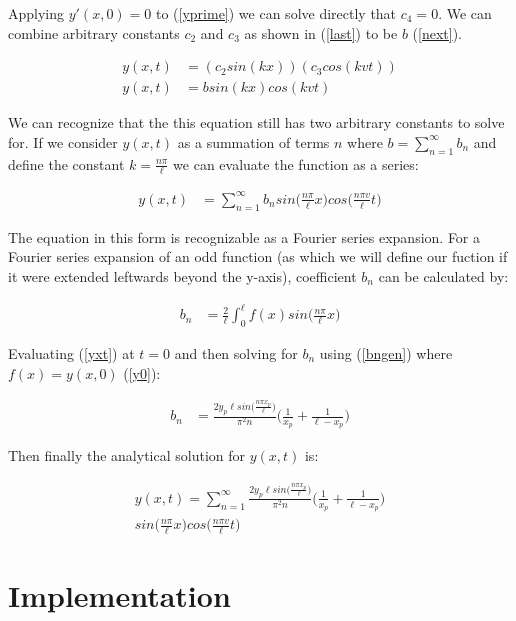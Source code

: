 \documentclass[%
 reprint,
 amsmath,amssymb,
 aps,
]{revtex4-1}
\begin{document}
Applying $y'(x,0)=0$ to (\ref{yprime}) we can solve directly that $c_4 = 0$. We can combine arbitrary constants $c_2$ and $c_3$ as shown in (\ref{last}) to be $b$ (\ref{next}).

\begin{align}
y(x,t) &=(c_2sin(kx))(c_3 cos(kvt)) \label{last}\\
y(x,t) &= b sin(kx)cos(kvt) \label{next}
\end{align}

We can recognize that the this equation still has two arbitrary constants to solve for. If we consider $y(x,t)$ as a summation of terms $n$ where $b = \sum_{n=1}^{\infty} b_n$ and define the constant $k = \frac{n\pi}{\ell}$ we can evaluate the function as a series:

\begin{align}
y(x,t) &= \sum_{n=1}^{\infty} b_n sin\Big(\frac{n\pi}{\ell}x\Big)cos\Big(\frac{n\pi v}{\ell}t\Big) \label{yxt}
\end{align}

The equation in this form is recognizable as a Fourier series expansion. For a Fourier series expansion of an odd function (as which we will define our fuction if it were extended leftwards beyond the y-axis), coefficient $b_n$ can be calculated by:

\begin{align}
b_n &= \frac{2}{\ell} \int_{0}^{\ell} f(x)sin\Big(\frac{n\pi}{\ell}x\Big) \label{bngen}
\end{align}

Evaluating (\ref{yxt}) at $t=0$ and then solving for $b_n$ using (\ref{bngen}) where $f(x) = y(x,0)$ (\ref{y0}):

\begin{align}
b_n &= \frac{2y_p\ell sin\Big(\frac{n \pi x_p}{\ell}\Big)}{\pi^2 n}\Big(\frac{1}{x_p} + \frac{1}{\ell-x_p}\Big)
\end{align}

Then finally the analytical solution for $y(x,t)$ is:

\begin{multline}
y(x,t) =\sum_{n=1}^{\infty} \frac{2y_p\ell sin\Big(\frac{n \pi x_p}{\ell}\Big)}{\pi^2 n}\Big(\frac{1}{x_p} + \frac{1}{\ell-x_p}\Big) \\ sin\Big(\frac{n\pi}{\ell}x\Big)cos\Big(\frac{n\pi v}{\ell}t\Big) \label{yxtfinal}
\end{multline}

\section{\label{sec:level1}Implementation}
\end{document}
